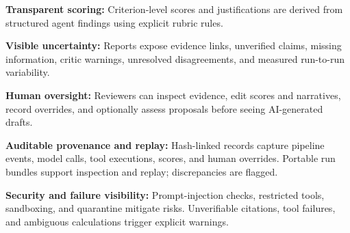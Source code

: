 \documentclass[11pt,twoside]{article}
\begin{document}
\noindent \textbf{Transparent scoring:} Criterion-level scores and justifications are derived from structured agent findings using explicit rubric rules.

\noindent \textbf{Visible uncertainty:} Reports expose evidence links, unverified claims, missing information, critic warnings, unresolved disagreements, and measured run-to-run variability.

\noindent \textbf{Human oversight:} Reviewers can inspect evidence, edit scores and narratives, record overrides, and optionally assess proposals before seeing AI-generated drafts.

\noindent \textbf{Auditable provenance and replay:} Hash-linked records capture pipeline events, model calls, tool executions, scores, and human overrides. Portable run bundles support inspection and replay; discrepancies are flagged.

\noindent \textbf{Security and failure visibility:} Prompt-injection checks, restricted tools, sandboxing, and quarantine mitigate risks. Unverifiable citations, tool failures, and ambiguous calculations trigger explicit warnings.


\end{document}
